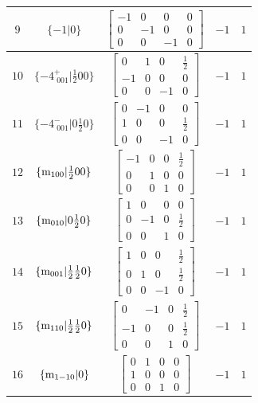 \documentclass[fleqn,8pt]{jsarticle}
\begin{document}
\begin{longtable}{ccccc}
$ 9 $ & $ \{-1|0\} $ & $ \begin{bmatrix} -1 & 0 & 0 & 0 \\ 0 & -1 & 0 & 0 \\ 0 & 0 & -1 & 0 \end{bmatrix} $ & $ -1 $ & $ 1 $ \\ \hline
$ 10 $ & $ \{-4^{+}_{\,\,001}|\frac{1}{2} 0 0\} $ & $ \begin{bmatrix} 0 & 1 & 0 & \frac{1}{2} \\ -1 & 0 & 0 & 0 \\ 0 & 0 & -1 & 0 \end{bmatrix} $ & $ -1 $ & $ 1 $ \\ \hline
$ 11 $ & $ \{-4^{-}_{\,\,001}|0 \frac{1}{2} 0\} $ & $ \begin{bmatrix} 0 & -1 & 0 & 0 \\ 1 & 0 & 0 & \frac{1}{2} \\ 0 & 0 & -1 & 0 \end{bmatrix} $ & $ -1 $ & $ 1 $ \\ \hline
$ 12 $ & $ \{{\rm m}_{100}|\frac{1}{2} 0 0\} $ & $ \begin{bmatrix} -1 & 0 & 0 & \frac{1}{2} \\ 0 & 1 & 0 & 0 \\ 0 & 0 & 1 & 0 \end{bmatrix} $ & $ -1 $ & $ 1 $ \\ \hline
$ 13 $ & $ \{{\rm m}_{010}|0 \frac{1}{2} 0\} $ & $ \begin{bmatrix} 1 & 0 & 0 & 0 \\ 0 & -1 & 0 & \frac{1}{2} \\ 0 & 0 & 1 & 0 \end{bmatrix} $ & $ -1 $ & $ 1 $ \\ \hline
$ 14 $ & $ \{{\rm m}_{001}|\frac{1}{2} \frac{1}{2} 0\} $ & $ \begin{bmatrix} 1 & 0 & 0 & \frac{1}{2} \\ 0 & 1 & 0 & \frac{1}{2} \\ 0 & 0 & -1 & 0 \end{bmatrix} $ & $ -1 $ & $ 1 $ \\ \hline
$ 15 $ & $ \{{\rm m}_{110}|\frac{1}{2} \frac{1}{2} 0\} $ & $ \begin{bmatrix} 0 & -1 & 0 & \frac{1}{2} \\ -1 & 0 & 0 & \frac{1}{2} \\ 0 & 0 & 1 & 0 \end{bmatrix} $ & $ -1 $ & $ 1 $ \\ \hline
$ 16 $ & $ \{{\rm m}_{1-10}|0\} $ & $ \begin{bmatrix} 0 & 1 & 0 & 0 \\ 1 & 0 & 0 & 0 \\ 0 & 0 & 1 & 0 \end{bmatrix} $ & $ -1 $ & $ 1 $ \\ \hline

\end{longtable}
\end{document}
